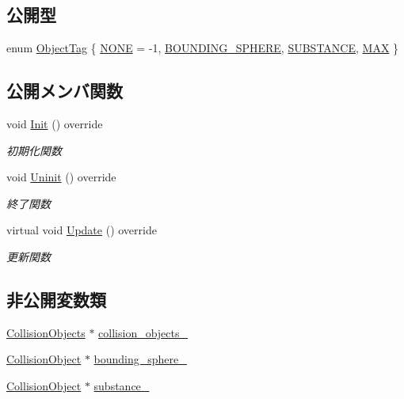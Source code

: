 \subsection*{公開型}
\begin{DoxyCompactItemize}
\item 
enum \mbox{\hyperlink{class_goal_collision_a8d0d760973816d9086df90491f38ff62}{Object\+Tag}} \{ \mbox{\hyperlink{class_goal_collision_a8d0d760973816d9086df90491f38ff62ad664dba1ab9212a7a0c29f3d113f74ba}{N\+O\+NE}} = -\/1, 
\mbox{\hyperlink{class_goal_collision_a8d0d760973816d9086df90491f38ff62ac2036d06505fcf67ddd968f97179789d}{B\+O\+U\+N\+D\+I\+N\+G\+\_\+\+S\+P\+H\+E\+RE}}, 
\mbox{\hyperlink{class_goal_collision_a8d0d760973816d9086df90491f38ff62a99519b2786b3bc408ca13eda97606b81}{S\+U\+B\+S\+T\+A\+N\+CE}}, 
\mbox{\hyperlink{class_goal_collision_a8d0d760973816d9086df90491f38ff62ac8b39f34903a130505e1c485f7667e07}{M\+AX}}
 \}
\end{DoxyCompactItemize}
\subsection*{公開メンバ関数}
\begin{DoxyCompactItemize}
\item 
void \mbox{\hyperlink{class_goal_collision_ab6089638f5390e019a55ae11952e1cf9}{Init}} () override
\begin{DoxyCompactList}\small\item\em 初期化関数 \end{DoxyCompactList}\item 
void \mbox{\hyperlink{class_goal_collision_ab818bad44ffcd595f1c495e659c0b348}{Uninit}} () override
\begin{DoxyCompactList}\small\item\em 終了関数 \end{DoxyCompactList}\item 
virtual void \mbox{\hyperlink{class_goal_collision_a1e3995dc2f5ba2678580d06699ca6936}{Update}} () override
\begin{DoxyCompactList}\small\item\em 更新関数 \end{DoxyCompactList}\end{DoxyCompactItemize}
\subsection*{非公開変数類}
\begin{DoxyCompactItemize}
\item 
\mbox{\hyperlink{class_collision_objects}{Collision\+Objects}} $\ast$ \mbox{\hyperlink{class_goal_collision_ae04c3bbf4fd5e382b63443466a8cc141}{collision\+\_\+objects\+\_\+}}
\item 
\mbox{\hyperlink{class_collision_object}{Collision\+Object}} $\ast$ \mbox{\hyperlink{class_goal_collision_a584c7b2e79411a9fb86fe03f0235ea02}{bounding\+\_\+sphere\+\_\+}}
\item 
\mbox{\hyperlink{class_collision_object}{Collision\+Object}} $\ast$ \mbox{\hyperlink{class_goal_collision_a8fa4a9b7ed96d453d4615641073937bb}{substance\+\_\+}}
\end{DoxyCompactItemize}
